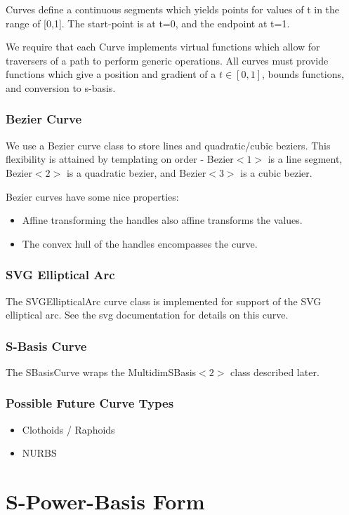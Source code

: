 \documentclass[openany]{book}
\newcommand{\code}[1]{\textsf{#1}}
\begin{document}
Curves define a continuous segments which yields points for values of
t in the range of [0,1].  The start-point is at t=0, and the endpoint
at t=1.

We require that each \code{Curve} implements virtual functions which
allow for traversers of a path to perform generic operations.  All
curves must provide functions which give a position and gradient of a
$t \in [0,1]$, bounds functions, and conversion to s-basis.

\subsection{Bezier Curve}
We use a \code{Bezier} curve class to store lines and quadratic/cubic
beziers.  This flexibility is attained by templating on order -
\code{Bezier$<1>$} is a line segment, \code{Bezier$<2>$} is a quadratic
bezier, and \code{Bezier$<3>$} is a cubic bezier.

Bezier curves have some nice properties:
\begin{itemize}
\item Affine transforming the handles also affine transforms the values.
\item The convex hull of the handles encompasses the curve.
\end{itemize}

\subsection{SVG Elliptical Arc}
The \code{SVGEllipticalArc} curve class is implemented for support of
the SVG elliptical arc.  See the svg documentation for details on this
curve.

\subsection{S-Basis Curve}
The \code{SBasisCurve} wraps the \code{MultidimSBasis$<2>$} class
described later.

\subsection{Possible Future Curve Types}
\begin{itemize}
\item Clothoids / Raphoids
\item NURBS
\end{itemize}

\chapter{S-Power-Basis Form}
\end{document}
